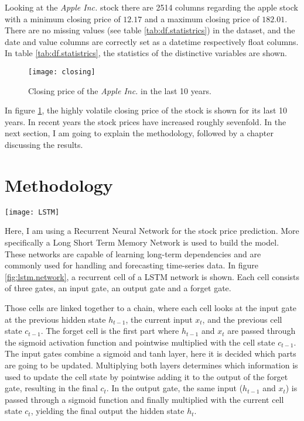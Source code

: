\documentclass[fleqn,10pt]{SelfArx} %
\begin{document}
Looking at the \textit{Apple Inc.} stock there are 2514 columns regarding the apple stock with a minimum closing price of $12.17$ and a maximum closing price of $182.01$. There are no missing values (see table \ref{tab:df.statistrics}) in the dataset, and the date and value columns are correctly set as a datetime respectively float columns. In table \ref{tab:df.statistrics}, the statistics of the distinctive variables are shown.

\begin{figure}[ht]\centering
	\texttt{[image: closing]}
	\caption{Closing price of the \textit{Apple Inc.} in the last 10 years.}
	\label{fig:results}
\end{figure}

In figure \ref{fig:results}, the highly volatile closing price of the stock is shown for its last 10 years. In recent years the stock prices have increased roughly sevenfold. In the next section, I am going to explain the methodology, followed by a chapter discussing the results.





\section{Methodology}

\begin{figure*}[htb]\centering %
	\texttt{[image: LSTM]}
	\caption{The reccurent cell of a LSTM network \cite{LSTM}.}
	\label{fig:lstm.network}
\end{figure*}

Here, I am using a Recurrent Neural Network for the stock price prediction. More specifically a Long Short Term Memory Network is used to build the model. These networks are capable of learning long-term dependencies and are commonly used for handling and forecasting time-series data. In figure \ref{fig:lstm.network}, a recurrent cell of a LSTM network is shown. Each cell consists of three gates, an input gate, an output gate and a forget gate. \cite{LSTMexplained}

Those cells are linked together to a chain, where each cell looks at the input gate at the previous hidden state $h_{t-1}$, the current input $x_t$, and the previous cell state $c_{t-1}$. The forget cell is the first part where $h_{t-1}$ and $x_t$ are passed through the sigmoid activation function and pointwise multiplied with the cell state $c_{t-1}$. The input gates combine a sigmoid and tanh layer, here it is decided which parts are going to be updated. Multiplying both layers determines which information is used to update the cell state by pointwise adding it to the output of the forget gate, resulting in the final $c_t$.
In the output gate, the same input ($h_{t-1}$ and $x_t$) is passed through a sigmoid function and finally multiplied with the current cell state $c_t$, yielding the final output the hidden state $h_t$. \cite{LSTMexplained1}
\end{document}
